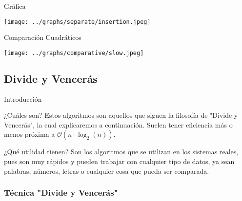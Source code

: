 \documentclass[compress]{beamer}
\begin{document}
\begin{frame}{Gráfica}
	\begin{alertblock}{}
		\begin{center}
		\texttt{[image: ../graphs/separate/insertion.jpeg]}
		\end{center}
	\end{alertblock}
\end{frame}

\begin{frame}{Comparación Cuadráticos}
	\begin{alertblock}{}
		\begin{center}
		\texttt{[image: ../graphs/comparative/slow.jpeg]}
		\end{center}
	\end{alertblock}
\end{frame}

\subsection{Divide y Vencerás}

\begin{frame}{Introducción}
	\begin{block}{¿Cuáles son?}
	Estos algoritmos son aquellos que siguen la filosofía de "Divide y Vencerás", la cual explicaremos a continuación. Suelen tener eficiencia más o menos próxima a $\mathcal{O}(n\cdot\log_2(n))$.
	\end{block}
\vspace{0.20in}
	\begin{block}{¿Qué utilidad tienen?}
	Son los algoritmos que se utilizan en los sistemas reales, pues son muy rápidos y pueden trabajar con cualquier tipo de datos, ya sean palabras, números, letras o cualquier cosa que pueda ser comparada.
	\end{block}
\end{frame}

\subsubsection{Técnica "Divide y Vencerás"}
\end{document}
